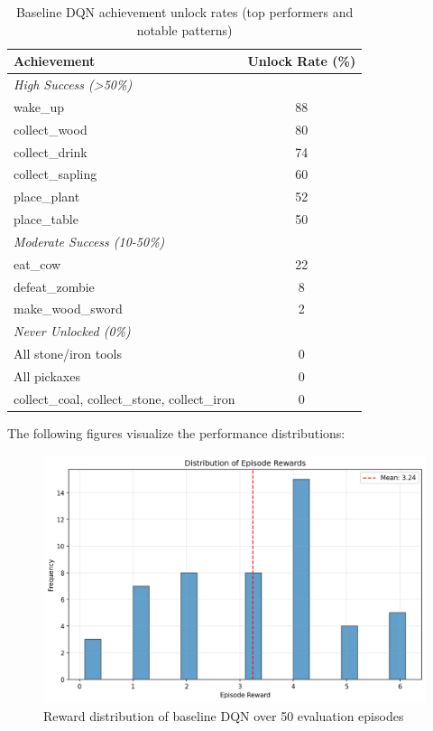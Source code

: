 \documentclass[twocolumn]{article}
\begin{document}
\begin{table}[H]
\centering
\small
\begin{tabular}{lc}
\toprule
\textbf{Achievement} & \textbf{Unlock Rate (\%)} \\
\midrule
\multicolumn{2}{l}{\textit{High Success (>50\%)}} \\
wake\_up & 88 \\
collect\_wood & 80 \\
collect\_drink & 74 \\
collect\_sapling & 60 \\
place\_plant & 52 \\
place\_table & 50 \\
\midrule
\multicolumn{2}{l}{\textit{Moderate Success (10-50\%)}} \\
eat\_cow & 22 \\
defeat\_zombie & 8 \\
make\_wood\_sword & 2 \\
\midrule
\multicolumn{2}{l}{\textit{Never Unlocked (0\%)}} \\
All stone/iron tools & 0 \\
All pickaxes & 0 \\
collect\_coal, collect\_stone, collect\_iron & 0 \\
\bottomrule
\end{tabular}
\caption{Baseline DQN achievement unlock rates (top performers and notable patterns)}
\end{table}

The following figures visualize the performance distributions:

\begin{figure}[H]
    \centering
    \includegraphics[width=0.8\linewidth]{images/DQNbaseline1_reward.png}
    \caption{Reward distribution of baseline DQN over 50 evaluation episodes}
    \label{fig:dqn_baseline_reward}
\end{figure}
\end{document}
